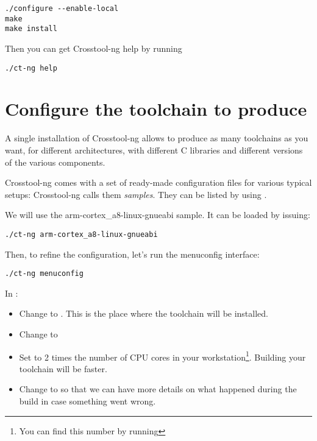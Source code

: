 \begin{verbatim}
./configure --enable-local
make
make install
\end{verbatim}

Then you can get Crosstool-ng help by running

\begin{verbatim}
./ct-ng help
\end{verbatim}

\section{Configure the toolchain to produce}

A single installation of Crosstool-ng allows to produce as many
toolchains as you want, for different architectures, with different C
libraries and different versions of the various components.

Crosstool-ng comes with a set of ready-made configuration files for
various typical setups: Crosstool-ng calls them {\em samples}. They can be
listed by using .

We will use the arm-cortex\_a8-linux-gnueabi sample. It can be loaded by issuing:

\begin{verbatim}
./ct-ng arm-cortex_a8-linux-gnueabi
\end{verbatim}

Then, to refine the configuration, let's run the menuconfig interface:

\begin{verbatim}
./ct-ng menuconfig
\end{verbatim}

In :

\begin{itemize}
\item Change  to
  . This is the place where
  the toolchain will be installed.
\item Change  to 
\item Set  to 2 times the number of CPU cores
  in your workstation\footnote{You can find this number by running }. Building your toolchain will be faster.
\item Change  to  so that we can have more
  details on what happened during the build in case something went wrong.
\end{itemize}


